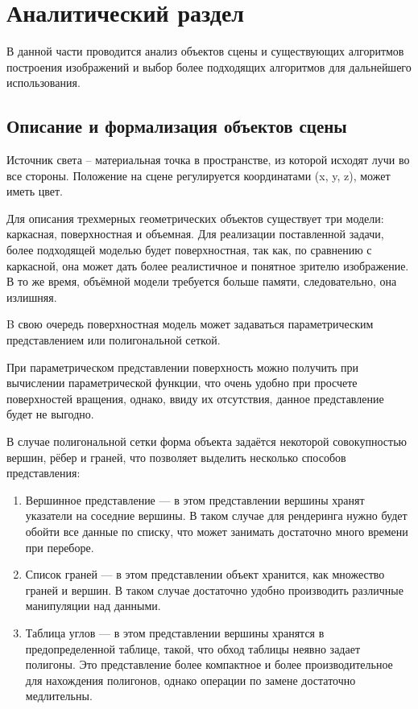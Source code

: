 \chapter{Аналитический раздел}

В данной части проводится анализ объектов сцены и существующих алгоритмов построения изображений и выбор более подходящих алгоритмов для дальнейшего использования.

\section{Описание и формализация объектов сцены}

Источник света – материальная точка в пространстве, из которой исходят лучи во все стороны. Положение на сцене регулируется координатами (x, y, z), может иметь цвет.

Для описания трехмерных геометрических объектов существует три модели: каркасная, поверхностная и объемная. Для реализации поставленной задачи, более подходящей моделью будет поверхностная, так как, по сравнению с каркасной, она может дать более реалистичное и понятное зрителю изображение. В то же время, объёмной модели требуется больше памяти, следовательно, она излишняя.

B свою очередь поверхностная модель может задаваться параметрическим представлением или полигональной сеткой.

При параметрическом представлении поверхность можно получить при вычислении параметрической функции, что очень удобно при просчете поверхностей вращения, однако, ввиду их отсутствия, данное представление будет не выгодно.

В случае полигональной сетки форма объекта задаётся некоторой совокупностью вершин, рёбер и граней, что позволяет выделить несколько способов представления:

\begin{enumerate}[label=\arabic*)]
	\item Вершинное представление --- в этом представлении вершины хранят указатели на соседние вершины. В таком случае для рендеринга нужно будет обойти все данные по списку, что может занимать достаточно много времени при переборе.
	\item Список граней --- в этом представлении объект хранится, как множество граней и вершин. В таком случае достаточно удобно производить различные манипуляции над данными.
	\item Таблица углов --- в этом представлении вершины хранятся в предопределенной таблице, такой, что обход таблицы неявно задает полигоны. Это представление более компактное и более производительное для нахождения полигонов, однако операции по замене достаточно медлительны.
\end{enumerate}

